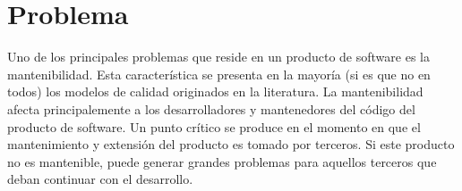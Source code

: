 
\section{Problema}

Uno de los principales problemas que reside en un producto de software es la
mantenibilidad. Esta característica se presenta en la mayoría (si es que no en todos) los
modelos de calidad originados en la literatura.
La mantenibilidad afecta principalemente a los desarrolladores y mantenedores del código
del producto de software.
Un punto crítico se produce en el momento en que el mantenimiento y extensión del producto
es tomado por terceros. Si este producto no es mantenible, puede generar grandes problemas
para aquellos terceros que deban continuar con el desarrollo.
